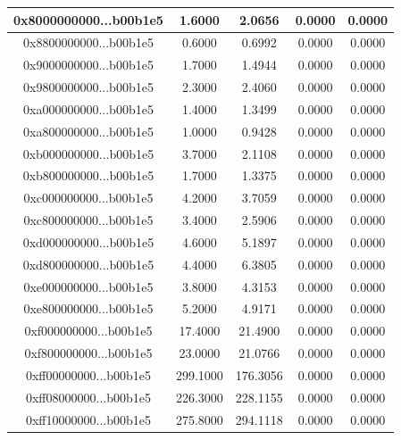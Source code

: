 \documentclass[12pt, a4paper]{article}
\begin{document}
\begin{table}[H]
\begin{tabular}{|c|c|c|c|c|}
0x8000000000...b00b1e5 &        1.6000 &        2.0656 &         0.0000 &        0.0000 \\ \hline
0x8800000000...b00b1e5 &        0.6000 &        0.6992 &         0.0000 &        0.0000 \\ \hline
0x9000000000...b00b1e5 &        1.7000 &        1.4944 &         0.0000 &        0.0000 \\ \hline
0x9800000000...b00b1e5 &        2.3000 &        2.4060 &         0.0000 &        0.0000 \\ \hline
0xa000000000...b00b1e5 &        1.4000 &        1.3499 &         0.0000 &        0.0000 \\ \hline
0xa800000000...b00b1e5 &        1.0000 &        0.9428 &         0.0000 &        0.0000 \\ \hline
0xb000000000...b00b1e5 &        3.7000 &        2.1108 &         0.0000 &        0.0000 \\ \hline
0xb800000000...b00b1e5 &        1.7000 &        1.3375 &         0.0000 &        0.0000 \\ \hline
0xc000000000...b00b1e5 &        4.2000 &        3.7059 &         0.0000 &        0.0000 \\ \hline
0xc800000000...b00b1e5 &        3.4000 &        2.5906 &         0.0000 &        0.0000 \\ \hline
0xd000000000...b00b1e5 &        4.6000 &        5.1897 &         0.0000 &        0.0000 \\ \hline
0xd800000000...b00b1e5 &        4.4000 &        6.3805 &         0.0000 &        0.0000 \\ \hline
0xe000000000...b00b1e5 &        3.8000 &        4.3153 &         0.0000 &        0.0000 \\ \hline
0xe800000000...b00b1e5 &        5.2000 &        4.9171 &         0.0000 &        0.0000 \\ \hline
0xf000000000...b00b1e5 &       17.4000 &       21.4900 &         0.0000 &        0.0000 \\ \hline
0xf800000000...b00b1e5 &       23.0000 &       21.0766 &         0.0000 &        0.0000 \\ \hline
0xff00000000...b00b1e5 &      299.1000 &      176.3056 &         0.0000 &        0.0000 \\ \hline
0xff08000000...b00b1e5 &      226.3000 &      228.1155 &         0.0000 &        0.0000 \\ \hline
0xff10000000...b00b1e5 &      275.8000 &      294.1118 &         0.0000 &        0.0000 \\ \hline

\end{tabular}
\end{table}
\end{document}
